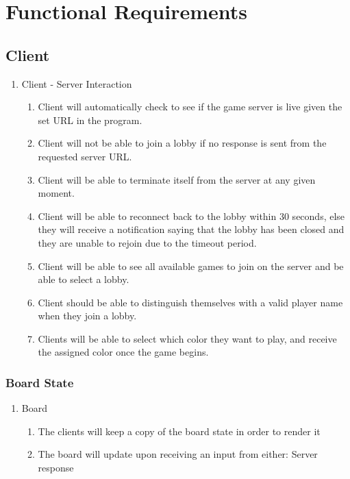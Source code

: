 \documentclass{scrreprt}
\begin{document}
\chapter{Functional Requirements}

\section{Client}

\begin{enumerate}[label*=R\arabic*.]
    \item Client - Server Interaction
    \begin{enumerate}[label*=\arabic*.]
        \item Client will automatically check to see if the game server is live given the set URL in the program.
        \item Client will not be able to join a lobby if no response is sent from the requested server URL.
        \item Client will be able to terminate itself from the server at any given moment.
        \item Client will be able to reconnect back to the lobby within 30 seconds, else they will receive a notification saying that the lobby has been closed and they are unable to rejoin due to the timeout period.
        \item Client will be able to see all available games to join on the server and be able to select a lobby.
        \item Client should be able to distinguish themselves with a valid player name when they join a lobby.
        \item Clients will be able to select which color they want to play, and receive the assigned color once the game begins.
    \end{enumerate}
\end{enumerate}

\subsection{Board State}

\begin{enumerate}[resume*]
    \item Board
    \begin{enumerate}[label*=\arabic*.]
        \item The clients will keep a copy of the board state in order to render it
        \item The board will update upon receiving an input from either:
            \subitem Server response
    \end{enumerate}
\end{enumerate}
\end{document}
